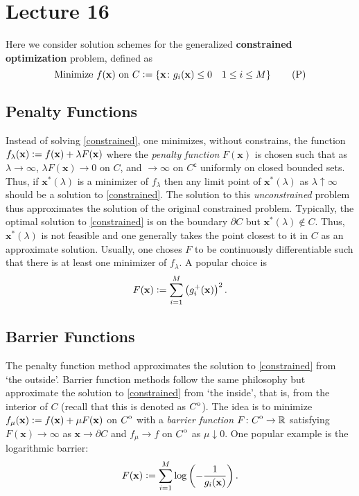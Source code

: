 \section{Lecture 16}

Here we consider solution schemes for the generalized \textbf{constrained optimization} problem, defined as 
\begin{equation}
    \label{constrained}
    \text{Minimize } f(\mathbf{x}) \text{ on } C \vcentcolon= \left\{ \mathbf{x} \colon g_i(\mathbf{x}) \leq 0 \quad 1 \leq i \leq M \right\} \tag{P}
\end{equation}

\subsection*{Penalty Functions}

Instead of solving \eqref{constrained}, one minimizes, without constrains, the function $f_{\lambda}(\mathbf{x}) \vcentcolon= f(\mathbf{x}) + \lambda F(\mathbf{x})$ where the \textit{penalty function} $F(\mathbf{x})$ is chosen such that as $\lambda \to \infty$, $\lambda F(\mathbf{x}) \to 0$ on $C$, and $\to \infty$ on $C^{\mathsf{c}}$ uniformly on closed bounded sets. Thus, if $\mathbf{x}^*(\lambda)$ is a minimizer of $f_{\lambda}$ then any limit point of $\mathbf{x}^*(\lambda)$ as $\lambda \uparrow \infty$ should be a solution to \eqref{constrained}. The solution to this \textit{unconstrained} problem thus approximates the solution of the original constrained problem. Typically, the optimal solution to \eqref{constrained} is on the boundary $\partial C$ but $\mathbf{x}^*(\lambda) \notin C$. Thus, $\mathbf{x}^*(\lambda)$ is not feasible and one generally takes the point closest to it in $C$ as an approximate solution. Usually, one choses $F$ to be continuously differentiable such that there is at least one minimizer of $f_{\lambda}$. A popular choice is
\[
    F(\mathbf{x}) \vcentcolon= \sum_{i=1}^M \left( g_i^+(\mathbf{x}) \right)^2.
\]

\subsection*{Barrier Functions}

The penalty function method approximates the solution to \eqref{constrained} from `the outside'. Barrier function methods follow the same philosophy but approximate the solution to \eqref{constrained} from `the inside', that is, from the interior of $C$ (recall that this is denoted as ${\kern0ptC}^{\mathrm{o}}$). The idea is to minimize $f_{\mu}(\mathbf{x}) \vcentcolon= f(\mathbf{x}) + \mu F(\mathbf{x})$ on ${\kern0ptC}^{\mathrm{o}}$ with a \textit{barrier function} $F \colon {\kern0ptC}^{\mathrm{o}} \to \mathbb{R}$ satisfying $F(\mathbf{x}) \to \infty$ as $\mathbf{x} \to \partial C$ and $f_{\mu} \to f$ on ${\kern0ptC}^{\mathrm{o}}$ as $\mu \downarrow 0$. One popular example is the logarithmic barrier:
\[
    F(\mathbf{x}) \vcentcolon= \sum_{i=1}^M \log \left( - \frac{1}{g_i(\mathbf{x})} \right).
\]

